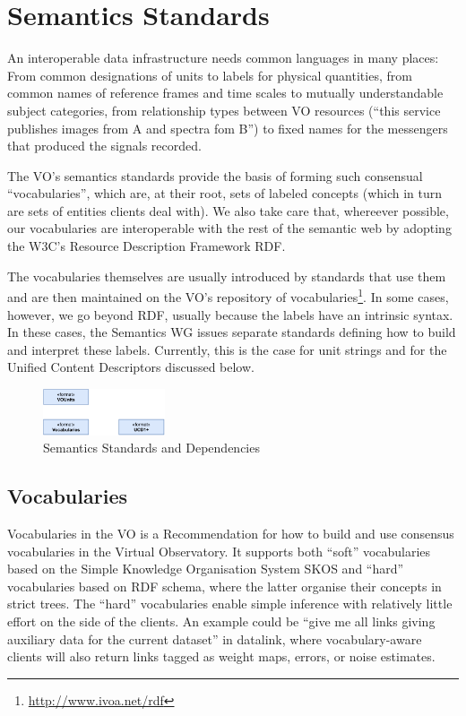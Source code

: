 \documentclass[11pt,a4paper]{ivoa}
\begin{document}
\section{Semantics Standards}

An interoperable data infrastructure needs common languages in many
places: From common designations of units to labels for physical
quantities, from common names of reference frames and time scales to
mutually understandable subject categories, from relationship types
between VO resources (``this service publishes images from A and spectra
fom B'') to fixed names for the messengers that produced the signals
recorded.

The VO's semantics standards provide the basis of forming such
consensual ``vocabularies'', which are, at their root, sets of labeled
concepts (which in turn are sets of entities clients deal with).  We
also take care that, whereever possible, our vocabularies are
interoperable with the rest of the semantic web by adopting the W3C's
Resource Description Framework RDF.

The vocabularies themselves are usually introduced by standards that use
them and are then maintained on the VO's repository of
vocabularies\footnote{\url{http://www.ivoa.net/rdf}}.  In some cases,
however, we go beyond RDF, usually because the labels have an intrinsic
syntax.  In these cases, the Semantics WG issues separate standards
defining how to build and interpret these labels.  Currently, this is
the case for unit strings and for the Unified Content Descriptors
discussed below.

\begin{figure}[h]
\centering
\includegraphics[width=0.32\textwidth]{ivoa-arch-semantics.pdf}
\caption{Semantics Standards and Dependencies}
\label{fig:semdeps}
\end{figure}

\subsection{Vocabularies}

Vocabularies in the VO is a Recommendation for how to build and use
consensus vocabularies in the Virtual Observatory.  It supports both
``soft'' vocabularies based on the Simple Knowledge Organisation System
SKOS and ``hard'' vocabularies based on RDF schema, where the latter
organise their concepts in strict trees.  The ``hard'' vocabularies
enable simple inference with relatively little effort on the side of
the clients.  An example could be ``give me all links giving auxiliary
data for the current dataset'' in datalink, where vocabulary-aware
clients will also return links tagged as weight maps, errors, or noise
estimates.
\end{document}
